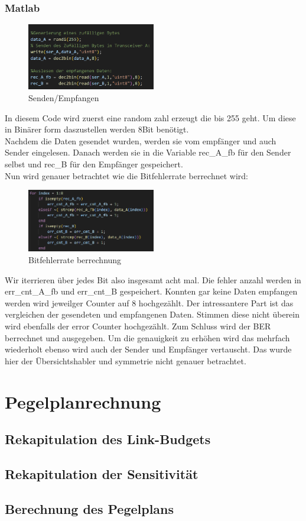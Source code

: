 \subsubsection{Matlab}
\begin{figure}[H]
    \centering
    \includegraphics[width=0.5\textwidth]{Pictures/einlesenMatlab.png}
    \caption{Senden/Empfangen}
    \label{fig:matlab_example}
\end{figure}
In diesem Code wird zuerst eine random zahl erzeugt die bis 255 geht.
Um diese in Binärer form daszustellen werden 8Bit benötigt.
\\
Nachdem die Daten gesendet wurden, werden sie vom empfänger und auch Sender eingelesen.
Danach werden sie in die Variable rec\_A\_fb für den Sender selbst und rec\_B für den Empfänger gespeichert.
\\
Nun wird genauer betrachtet wie die Bitfehlerrate berrechnet wird:
\begin{figure}[H]
    \centering
    \includegraphics[width=0.5\textwidth]{Pictures/vergleich.png}
    \caption{Bitfehlerrate berrechnung}
    \label{fig:bitfehler}
\end{figure}
Wir iterrieren über jedes Bit also insgesamt acht mal.
Die fehler anzahl werden in err\_cnt\_A\_fb und err\_cnt\_B gespeichert.
Konnten gar keine Daten empfangen werden wird jeweilger Counter auf 8 hochgezählt.
Der intressantere Part ist das vergleichen der gesendeten und empfangenen Daten.
Stimmen diese nicht überein wird ebenfalls der error Counter hochgezählt.
Zum Schluss wird der BER berrechnet und ausgegeben.
Um die genauigkeit zu erhöhen wird das mehrfach wiederholt ebenso wird auch der Sender und Empfänger vertauscht.
Das wurde hier der Übersichtshabler und symmetrie nicht genauer betrachtet.



\section{Pegelplanrechnung}
\subsection{Rekapitulation des Link-Budgets}
\subsection{Rekapitulation der Sensitivität}
\subsection{Berechnung des Pegelplans}